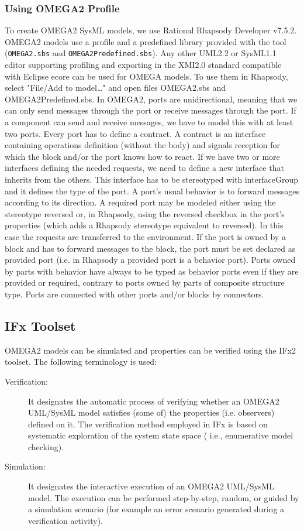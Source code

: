 \documentclass[a4paper,twoside]{article}
\begin{document}
\subsubsection{Using OMEGA2 Profile}

To create OMEGA2 SysML models, we use Rational Rhapsody Developer v7.5.2. OMEGA2 models use a profile and a predefined library provided with the tool (\texttt{OMEGA2.sbs} and \texttt{OMEGA2Predefined.sbs}). 
Any other UML2.2 or SysML1.1 editor supporting profiling and exporting in the XMI2.0 standard compatible with Eclipse ecore can be used for OMEGA models. To use them in Rhapsody, select "File/Add to model…" and open files OMEGA2.sbs and OMEGA2Predefined.sbs. 
In OMEGA2, ports are unidirectional, meaning that we can only send messages through the port or receive messages through the port. If a component can send and receive messages, we have to model this with at least two ports. Every port has to define a contract. A contract is an interface containing operations definition (without the body) and signals reception for which the block and/or the port knows how to react. If we have two or more interfaces defining the needed requests, we need to define a new interface that inherits from the others. This interface has to be stereotyped with  interfaceGroup and it defines the type of the port. A port’s usual behavior is to forward messages according to its direction. A required port may be modeled either using the stereotype reversed or, in Rhapsody, using the reversed checkbox in the port's properties (which adds a Rhapsody stereotype equivalent to reversed). In this case the requests are transferred to the environment. If the port is owned by a block and has to forward messages to the block, the port must be set declared as  provided port (i.e. in Rhapsody a provided port is a behavior port). Ports owned by parts with behavior have always to be typed as behavior ports even if they are provided or required, contrary to ports owned by parts of composite structure type. Ports are connected with other ports and/or blocks by connectors.

\subsection{IFx Toolset}

\noindent OMEGA2 models can be simulated and properties can be verified using the IFx2 toolset. The following terminology is used: 

\begin{description}
\item[Verification:] It designates  the  automatic  process  of  verifying  whether  an  OMEGA2  UML/SysML model  satisfies  (some  of)  the  properties  (i.e. observers)  defined  on  it.  The  verification  method employed in IFx is based on systematic exploration of the system state space ( i.e., enumerative model checking). 
\item[Simulation:] It designates  the  interactive  execution  of  an  OMEGA2  UML/SysML  model.  The execution  can    be  performed  step-by-step,  random,  or  guided  by  a  simulation  scenario  (for example an error scenario generated during a verification activity). 
\end{description}
\end{document}
